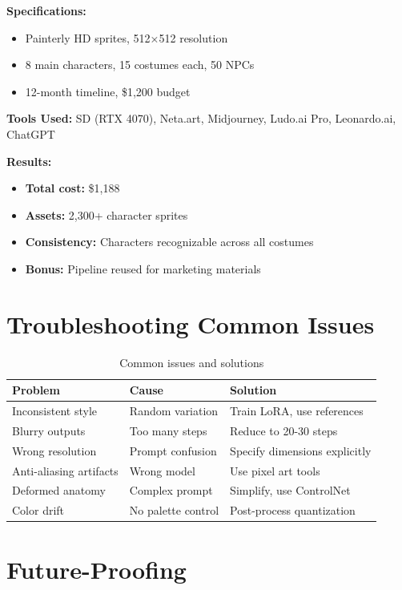\documentclass[11pt]{article}
\begin{document}
\textbf{Specifications:}
\begin{itemize}
    \item Painterly HD sprites, 512×512 resolution
    \item 8 main characters, 15 costumes each, 50 NPCs
    \item 12-month timeline, \$1,200 budget
\end{itemize}

\textbf{Tools Used:} SD (RTX 4070), Neta.art, Midjourney, Ludo.ai Pro, Leonardo.ai, ChatGPT

\textbf{Results:}
\begin{itemize}
    \item \textbf{Total cost:} \$1,188
    \item \textbf{Assets:} 2,300+ character sprites
    \item \textbf{Consistency:} Characters recognizable across all costumes
    \item \textbf{Bonus:} Pipeline reused for marketing materials
\end{itemize}

\section{Troubleshooting Common Issues}

\begin{table}[H]
\centering
\begin{tabular}{p{4.5cm}p{5cm}p{4cm}}
\toprule
\textbf{Problem} & \textbf{Cause} & \textbf{Solution} \\
\midrule
Inconsistent style & Random variation & Train LoRA, use references \\
Blurry outputs & Too many steps & Reduce to 20-30 steps \\
Wrong resolution & Prompt confusion & Specify dimensions explicitly \\
Anti-aliasing artifacts & Wrong model & Use pixel art tools \\
Deformed anatomy & Complex prompt & Simplify, use ControlNet \\
Color drift & No palette control & Post-process quantization \\
\bottomrule
\end{tabular}
\caption{Common issues and solutions}
\end{table}

\section{Future-Proofing}
\end{document}
